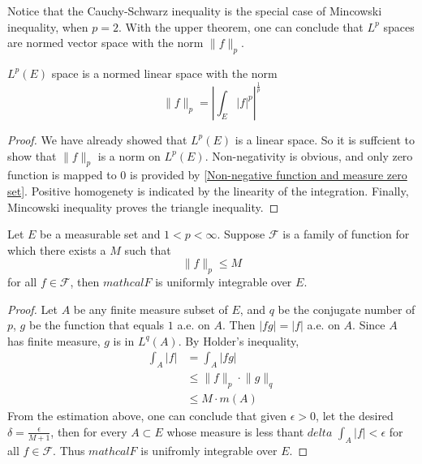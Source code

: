 \documentclass[lang=en, 12pt]{elegantbook}
\begin{document}
        Notice that the Cauchy-Schwarz inequality is the special case 
    of Mincowski inequality, when $p=2$. With the upper theorem, one can conclude that $L^p$ 
    spaces are normed vector space with the norm $\lVert f \rVert_p$.
        \begin{theorem}
            $L^p(E)$ space is a normed linear space with the norm
        $$\lVert f \rVert_p = \left| \int_E |f|^p \right|^{\frac{1}{p}}$$
        \end{theorem}
        \begin{proof}
            We have already showed that $L^p(E)$ is a linear space. So 
        it is suffcient to show that $\lVert f\rVert_p$ is a norm on $L^p(E)$.
        Non-negativity is obvious, and only zero function is mapped to $0$
        is provided by \ref{Non-negative function and measure zero set}.
            Positive homogenety is indicated by the linearity of the 
        integration. Finally, Mincowski inequality proves the triangle inequality.
        \end{proof}
        \begin{corollary}
            Let $E$ be a  measurable set and $1<p< \infty$. Suppose
        $\mathcal{F}$ is a family of function for which there exists a 
        $M$ such that 
        $$\lVert f\rVert_p \leq M$$
        for all $f \in \mathcal{F}$, then $mathcal{F}$ is uniformly integrable
        over $E$.
        \end{corollary}
        \begin{proof}
            Let $A$ be any finite measure subset of $E$, and $q$ be the 
        conjugate number of $p$, $g$ be the function that equals $1$
        a.e. on $A$. Then $|fg| = |f|$ a.e. on $A$. Since $A$ has finite 
        measure, $g$ is in $L^q(A)$. By Holder's inequality,
        \begin{equation*}
            \begin{aligned}
                \int_A |f| &= \int_A |fg|\\
                &\leq \lVert f \rVert_p \cdot \lVert g\rVert_q\\
                &\leq M \cdot m(A)
            \end{aligned}
        \end{equation*}
            From the estimation above, one can conclude that given 
        $\epsilon > 0$, let the desired $\delta = \frac{\epsilon}{M+1}$,
        then for every $A \subset E$ whose measure is less thant $delta$
        $\int_A |f| < \epsilon$ for all $f \in \mathcal{F}$. Thus 
        $mathcal{F}$ is unifromly integrable over $E$.  
        \end{proof}
\end{document}
